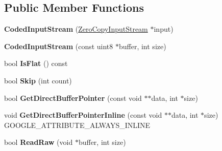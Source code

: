 \subsection*{Public Member Functions}
\begin{DoxyCompactItemize}
\item 
\mbox{\label{classgoogle_1_1protobuf_1_1io_1_1CodedInputStream_a44a83ea1cbf89fd06903cdc3add13b7e}} 
{\bfseries Coded\+Input\+Stream} (\hyperlink{classgoogle_1_1protobuf_1_1io_1_1ZeroCopyInputStream}{Zero\+Copy\+Input\+Stream} $\ast$input)
\item 
\mbox{\label{classgoogle_1_1protobuf_1_1io_1_1CodedInputStream_aa6d951813fcfdf5d92f35bb95f806420}} 
{\bfseries Coded\+Input\+Stream} (const uint8 $\ast$buffer, int size)
\item 
\mbox{\label{classgoogle_1_1protobuf_1_1io_1_1CodedInputStream_aa4cc302ec290bf45355c22f31cad35e6}} 
bool {\bfseries Is\+Flat} () const
\item 
\mbox{\label{classgoogle_1_1protobuf_1_1io_1_1CodedInputStream_af17ae94842f161ed70958cdd344bbf35}} 
bool {\bfseries Skip} (int count)
\item 
\mbox{\label{classgoogle_1_1protobuf_1_1io_1_1CodedInputStream_ae7a24a346936a019207b04227e3b21cd}} 
bool {\bfseries Get\+Direct\+Buffer\+Pointer} (const void $\ast$$\ast$data, int $\ast$size)
\item 
\mbox{\label{classgoogle_1_1protobuf_1_1io_1_1CodedInputStream_a5db6743aed84ac18571a2f22eea383db}} 
void {\bfseries Get\+Direct\+Buffer\+Pointer\+Inline} (const void $\ast$$\ast$data, int $\ast$size) G\+O\+O\+G\+L\+E\+\_\+\+A\+T\+T\+R\+I\+B\+U\+T\+E\+\_\+\+A\+L\+W\+A\+Y\+S\+\_\+\+I\+N\+L\+I\+NE
\item 
\mbox{\label{classgoogle_1_1protobuf_1_1io_1_1CodedInputStream_a9bcd442a3547ff1252593eed6ce6d9da}} 
bool {\bfseries Read\+Raw} (void $\ast$buffer, int size)
\item 

\end{DoxyCompactItemize}
